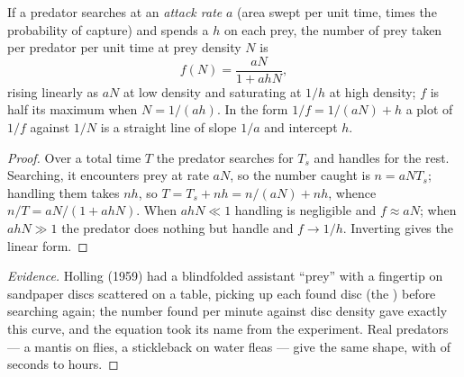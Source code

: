 \begin{theorem}\label{thm:b1:species-interactions:holling}
If a predator searches at an \emph{attack rate} $a$ (area swept per
unit time, times the probability of capture) and spends a  $h$ on each prey, the number of prey taken per predator per unit
time at prey density $N$ is
\[
f(N) = \frac{aN}{1 + ahN} ,
\]
rising linearly as $aN$ at low density and saturating at $1/h$ at
high density; $f$ is half its maximum when $N = 1/(ah)$. In the form
$1/f = 1/(aN) + h$ a plot of $1/f$ against $1/N$ is a straight line
of slope $1/a$ and intercept $h$.
\end{theorem}
\begin{proof}
Over a total time $T$ the predator searches for $T_s$ and handles for
the rest. Searching, it encounters prey at rate $aN$, so the number
caught is $n = aN T_s$; handling them takes $nh$, so $T = T_s + nh =
n/(aN) + nh$, whence $n/T = aN/(1 + ahN)$. When $ahN \ll 1$ handling is
negligible and $f \approx aN$; when $ahN \gg 1$ the predator does
nothing but handle and $f \to 1/h$. Inverting gives the linear form.
\end{proof}
\begin{proof}[Evidence]
Holling (1959) had a blindfolded assistant ``prey'' with a fingertip
on sandpaper discs scattered on a table, picking up each found disc
(the ) before searching again; the number found per
minute against disc density gave exactly this curve, and the equation
took its name from the experiment. Real predators --- a mantis on
flies, a stickleback on water fleas --- give the same shape, with
 of seconds to hours.
\end{proof}


